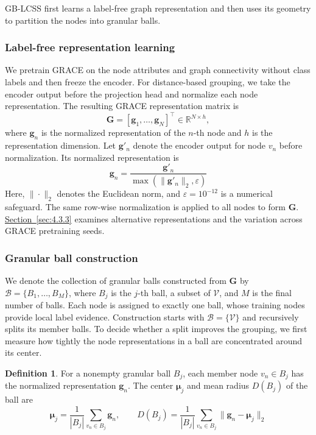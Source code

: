\documentclass[10pt,letterpaper,nopreprintline]{elsarticle}
\theoremstyle{definition}
\newtheorem{definition}{Definition}
\theoremstyle{plain}
\begin{document}
GB-LCSS first learns a label-free graph representation and then uses its geometry to partition the nodes into granular balls.

\subsubsection{Label-free representation learning}\label{sec:3.2.1}

We pretrain GRACE \cite{ref12} on the node attributes and graph connectivity without class labels and then freeze the encoder. For distance-based grouping, we take the encoder output before the projection head and normalize each node representation. The resulting GRACE representation matrix is
\begin{equation}\label{eq:2}
\mathbf G=[\mathbf g_1,\ldots,\mathbf g_N]^\top\in\mathbb R^{N\times h},
\end{equation}
where \(\mathbf g_n\) is the normalized representation of the \(n\)-th node and \(h\) is the representation dimension. Let \(\mathbf g'_n\) denote the encoder output for node \(v_n\) before normalization. Its normalized representation is
\begin{equation}\label{eq:3}
\mathbf g_n=\frac{\mathbf g'_n}{\max(\|\mathbf g'_n\|_2,\varepsilon)}
\end{equation}
Here, \(\|\cdot\|_2\) denotes the Euclidean norm, and \(\varepsilon=10^{-12}\) is a numerical safeguard. The same row-wise normalization is applied to all nodes to form \(\mathbf G\). \hyperref[sec:4.3.3]{Section~\ref*{sec:4.3.3}} examines alternative representations and the variation across GRACE pretraining seeds.

\subsubsection{Granular ball construction}\label{sec:3.2.2}

We denote the collection of granular balls constructed from \(\mathbf G\) by \(\mathcal B=\{B_1,\ldots,B_M\}\), where \(B_j\) is the \(j\)-th ball, a subset of \(\mathcal V\), and \(M\) is the final number of balls. Each node is assigned to exactly one ball, whose training nodes provide local label evidence. Construction starts with \(\mathcal B=\{\mathcal V\}\) and recursively splits its member balls. To decide whether a split improves the grouping, we first measure how tightly the node representations in a ball are concentrated around its center.

\Needspace{64pt}
\begin{definition}
For a nonempty granular ball \(B_j\), each member node \(v_n\in B_j\) has the normalized representation \(\mathbf g_n\). The center \(\boldsymbol\mu_j\) and mean radius \(D(B_j)\) of the ball are
\begin{equation}\label{eq:4}
\boldsymbol\mu_j=\frac{1}{|B_j|}\sum_{v_n\in B_j}\mathbf g_n,
\qquad D(B_j)=\frac{1}{|B_j|}\sum_{v_n\in B_j}\|\mathbf g_n-\boldsymbol\mu_j\|_2
\end{equation}
\end{definition}
\end{document}
